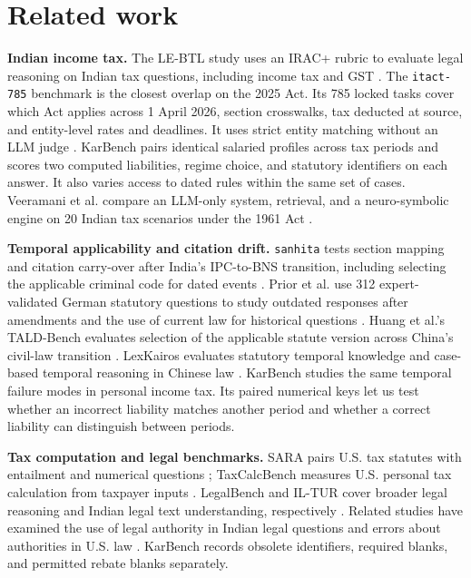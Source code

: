 \documentclass[10pt,letterpaper,twocolumn]{article}
\begin{document}
\section{Related work}

\textbf{Indian income tax.}
The LE-BTL study uses an IRAC+ rubric to evaluate legal reasoning on Indian tax questions, including income tax and GST \cite{lebtl}. The \texttt{itact-785} benchmark is the closest overlap on the 2025 Act. Its 785 locked tasks cover which Act applies across 1 April 2026, section crosswalks, tax deducted at source, and entity-level rates and deadlines. It uses strict entity matching without an LLM judge \cite{itact}. KarBench pairs identical salaried profiles across tax periods and scores two computed liabilities, regime choice, and statutory identifiers on each answer. It also varies access to dated rules within the same set of cases. Veeramani et al. compare an LLM-only system, retrieval, and a neuro-symbolic engine on 20 Indian tax scenarios under the 1961 Act \cite{ntol}.

\textbf{Temporal applicability and citation drift.}
\texttt{sanhita} tests section mapping and citation carry-over after India's IPC-to-BNS transition, including selecting the applicable criminal code for dated events \cite{sanhita}. Prior et al. use 312 expert-validated German statutory questions to study outdated responses after amendments and the use of current law for historical questions \cite{oldfriend}. Huang et al.'s TALD-Bench evaluates selection of the applicable statute version across China's civil-law transition \cite{tald}. LexKairos evaluates statutory temporal knowledge and case-based temporal reasoning in Chinese law \cite{lexkairos}. KarBench studies the same temporal failure modes in personal income tax. Its paired numerical keys let us test whether an incorrect liability matches another period and whether a correct liability can distinguish between periods.

\textbf{Tax computation and legal benchmarks.}
SARA pairs U.S. tax statutes with entailment and numerical questions \cite{sara}; TaxCalcBench measures U.S. personal tax calculation from taxpayer inputs \cite{taxcalcbench}. LegalBench and IL-TUR cover broader legal reasoning and Indian legal text understanding, respectively \cite{legalbench,iltur}. Related studies have examined the use of legal authority in Indian legal questions and errors about authorities in U.S. law \cite{courtready,legalfictions}. KarBench records obsolete identifiers, required blanks, and permitted rebate blanks separately.
\end{document}
